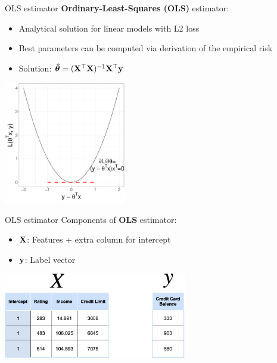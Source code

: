 \documentclass[11pt,compress,t,notes=noshow, xcolor=table]{beamer}
\begin{document}
\begin{vbframe}{OLS estimator}
\small \textbf{Ordinary-Least-Squares (OLS)} estimator: 
\begin{itemize}
    \item \small Analytical solution for linear models with L2 loss
    \item \small Best parameters can be computed via derivation of the empirical risk
    \item \small Solution:  $\bm{\hat\theta} = (\mathbf{X}^\top \mathbf{X})^{-1} \mathbf{X}^\top \mathbf{y}$
\end{itemize}

\begin{center}
 \includegraphics[width =0.4\textwidth]{figure/nutshell-regression-derivative-L2.pdf}
\end{center}
\end{vbframe}
   




\begin{vbframe}{OLS estimator}
Components of \textbf{OLS} estimator:
\begin{itemize}
    \item $\mathbf{X}$: Features + extra column for intercept
    \item $\mathbf{y}$: Label vector
\end{itemize}
\vspace{0.7 cm}
  \includegraphics[width = 0.6\textwidth]{figure_man/nutshell-regression-design-matrix.png}


\end{vbframe}
\end{document}
